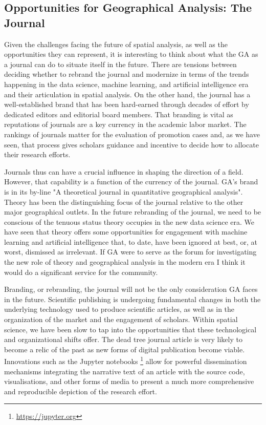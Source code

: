 \documentclass[11pt]{article}
\begin{document}
\subsection{Opportunities for Geographical Analysis: The Journal}
\label{sec:org01c95fd}


Given the challenges facing the future of spatial analysis, as well as the
opportunities they can represent, it is interesting to think about
what the GA as a journal can do to situate itself in the future. There are
tensions between deciding whether to rebrand the journal and modernize in terms
of the trends happening in the data science, machine learning, and artificial
intelligence era and their articulation in spatial analysis. On the other hand,
the journal has a well-established brand that has been hard-earned through 
decades of effort by dedicated editors and editorial board members. That
branding is vital as reputations of journals are a key currency in the
academic labor market. The rankings of journals matter for the evaluation of
promotion cases and, as we have seen, that process gives scholars guidance and
incentive to decide how to allocate their research  efforts.

Journals thus can have a crucial influence in shaping the direction of a field.
However, that capability is a function of the currency of the journal. GA's
brand is in its by-line "A theoretical journal in quantitative geographical
analysis". Theory has been the distinguishing focus of the journal relative to
the other major geographical outlets. In the future rebranding of the journal, we
need to be conscious of the tenuous status theory occupies in the new data science
era. We have seen that theory offers some opportunities for engagement with
machine learning and artificial intelligence that, to date, have been ignored at
best, or, at worst, dismissed as irrelevant. If GA were to serve as the forum
for investigating the new role of theory and geographical analysis in the modern
era I think it would do a significant service for the community.

Branding, or rebranding, the journal will not be the only consideration GA faces
in the future. Scientific publishing is undergoing fundamental changes in both
the underlying technology used to produce scientific articles, as well as in the
organization of the market and the engagement of scholars. Within spatial
science, we have been slow to tap into the opportunities that these technological
and organizational shifts offer. The dead tree journal article is very likely to
become a relic of the past as new forms of digital publication become viable.
Innovations such as the Jupyter notebooks \footnote{\url{https://jupyter.org}}
allow for powerful dissemination mechanisms integrating the narrative text of an
article  with the source code, visualisations, and other forms
of media to present a much more comprehensive and reproducible depiction of the
research effort.
\end{document}
